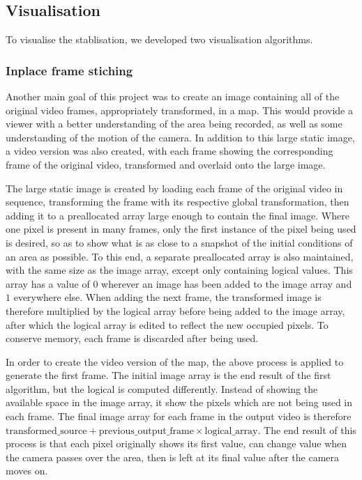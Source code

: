 \subsection{Visualisation}

To visualise the stablisation, we developed two visualisation algorithms.

\subsubsection{Inplace frame stiching}

Another main goal of this project was to create an image containing all of the original video frames,
appropriately transformed, in a map. 
This would provide a viewer with a better understanding of the area being recorded,
as well as some understanding of the motion of the camera.
In addition to this large static image,
a video version was also created,
with each frame showing the corresponding frame of the original video,
transformed and overlaid onto the large image.

The large static image is created by loading each frame of the original video in sequence,
transforming the frame with its respective global transformation,
then adding it to a preallocated array large enough to contain the final image.
Where one pixel is present in many frames, only the first instance of the pixel being used is desired,
so as to show what is as close to a snapshot of the initial conditions of an area as possible.
To this end, a separate preallocated array is also maintained,
with the same size as the image array, except only containing logical values.
This array has a value of $0$ wherever an image has been added to the image array and $1$ everywhere else. 
When adding the next frame,
the transformed image is therefore multiplied by the logical array before being added to the image array,
after which the logical array is edited to reflect the new occupied pixels.
To conserve memory, each frame is discarded after being used.

In order to create the video version of the map,
the above process is applied to generate the first frame.
The initial image array is the end result of the first algorithm, but the logical is computed differently.
Instead of showing the available space in the image array,
it show the pixels which are not being used in each frame.
The final image array for each frame in the output video is therefore
$\text{transformed\_source} + \text{previous\_output\_frame} \times \text{logical\_array}$.
The end result of this process is that each pixel originally shows its first value,
can change value when the camera passes over the area,
then is left at its final value after the camera moves on.

